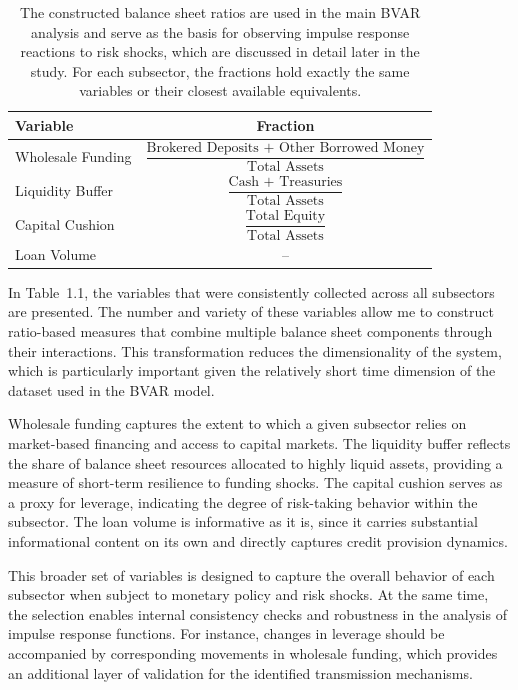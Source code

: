 \documentclass[12pt,a4paper]{report}\usepackage[a4paper, top=2.5cm, bottom=2.5cm, left=2.5cm, right=2.5cm]{geometry}
\begin{document}
\begin{table}[H]
\centering
\renewcommand{\arraystretch}{2.0}   %
\begin{tabular}{l|c}
\hline
\textbf{Variable} & \textbf{Fraction} \\
\hline
Wholesale Funding & $\dfrac{\text{Brokered Deposits + Other Borrowed Money}}{\text{Total Assets}}$ \\
Liquidity Buffer  & $\dfrac{\text{Cash + Treasuries}}{\text{Total Assets}}$ \\
Capital Cushion   & $\dfrac{\text{Total Equity}}{\text{Total Assets}}$ \\
Loan Volume       & -- \\
\hline
\end{tabular}
\caption{The constructed balance sheet ratios are used in the main BVAR analysis and serve as the basis for observing impulse response reactions to risk shocks, which are discussed in detail later in the study. For each subsector, the fractions hold exactly the same variables or their closest available equivalents.}
\label{tab:balance_sheet_ratios}
\end{table}

In Table~1.1, the variables that were consistently collected across all subsectors are presented.
The number and variety of these variables allow me to construct ratio-based measures that combine
multiple balance sheet components through their interactions. This transformation reduces the
dimensionality of the system, which is particularly important given the relatively short time
dimension of the dataset used in the BVAR model.

Wholesale funding captures the extent to which a given subsector relies on market-based financing
and access to capital markets. The liquidity buffer reflects the share of balance sheet resources
allocated to highly liquid assets, providing a measure of short-term resilience to funding shocks.
The capital cushion serves as a proxy for leverage, indicating the degree of risk-taking behavior
within the subsector. The loan volume is informative as it is, since it carries substantial informational content on its own and directly captures credit provision dynamics. 

This broader set of variables is designed to capture the overall behavior of each subsector when
subject to monetary policy and risk shocks. At the same time, the selection enables internal
consistency checks and robustness in the analysis of impulse response functions. For instance,
changes in leverage should be accompanied by corresponding movements in wholesale funding, which
provides an additional layer of validation for the identified transmission mechanisms.
\end{document}
